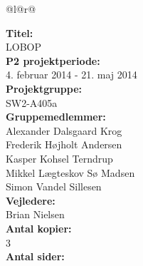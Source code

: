 
\newlength{\realparindent}
\newlength{\realparskip}
\setlength{\realparindent}{\parindent}
\setlength{\realparskip}{\parskip}

\begin{nopagebreak}
{\begin{center}
    \begin{tabular*}{\textwidth}{@{}l@{\extracolsep{\fill}}r@{}}
        \\
        \begin{minipage}[t]{0.49\textwidth}
            \textbf{Titel:}\\
            LOBOP\\
            
            \textbf{P2 projektperiode:}\\
            4. februar 2014 - 21. maj 2014\\
            
            \textbf{Projektgruppe:}\\
            SW2-A405a\\
            
            \textbf{Gruppemedlemmer:}\\
			Alexander Dalsgaard Krog\\
		    Frederik Højholt Andersen\\
		    Kasper Kohsel Terndrup\\
		    Mikkel Lægteskov Sø Madsen\\
		    Simon Vandel Sillesen\\
            
            \textbf{Vejledere:}\\
			Brian Nielsen\\
            
            \textbf{Antal kopier:}\\
            3\\
            
            \textbf{Antal sider:}\\
           	\numberpages\\ 
            

\end{minipage}
\end{tabular*}
\end{center}}
\end{nopagebreak}
